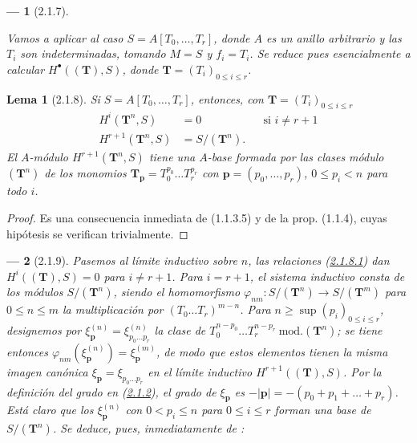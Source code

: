 \documentclass[10pt,oneside,openany]{book}
\theoremstyle{egaenv}\newtheorem*{env}{---}
\theoremstyle{egastatement}
\newtheorem*{lemma}{Lema}
\theoremstyle{egadescription}
\renewcommand{\leq}{\leqslant}
\renewcommand{\geq}{\geqslant}
\begin{document}
\begin{env}[2.1.7]
\label{III.2.1.7}
\label{III.2.1.7-fr}

Vamos a aplicar  al caso $S=A[T_0,\ldots,T_r]$, donde $A$ es un anillo arbitrario y las $T_i$ son indeterminadas, tomando $M=S$ y $f_i=T_i$. Se reduce pues esencialmente a calcular $H^\bullet((\mathbf T),S)$, donde $\mathbf T=(T_i)_{0\leq i\leq r}$.
\end{env}

\begin{lemma}[2.1.8]
\label{III.2.1.8}
\label{III.2.1.8-fr}
Si $S=A[T_0,\ldots,T_r]$, entonces, con $\mathbf T=(T_i)_{0\leq i\leq r}$
\begin{align}
\label{III.2.1.8.1-fr}
\tag{2.1.8.1}
H^i(\mathbf T^n,S)&=0 &&\text{si }i\neq r+1\\
\label{III.2.1.8.2-fr}
\tag{2.1.8.2}
H^{r+1}(\mathbf T^n,S)&=S/(\mathbf T^n).
\end{align}
El $A$-módulo $H^{r+1}(\mathbf T^n,S)$ tiene una $A$-base formada por las clases módulo $(\mathbf T^n)$ de los monomios
$\mathbf T_{\mathbf p}=T_0^{p_0}\ldots T_r^{p_r}$ con
$\mathbf p=(p_0,\ldots,p_r)$, $0\leq p_i<n$ para todo $i$.
\end{lemma}

\begin{proof}
Es una consecuencia inmediata de (1.1.3.5) y de la prop. (1.1.4), cuyas
hipótesis se verifican trivialmente.
\end{proof}

\begin{env}[2.1.9]
\label{III.2.1.9-fr}
Pasemos al límite inductivo sobre $n$, las relaciones (\hyperref[III.2.1.8.1]{2.1.8.1}) dan $H^i((\mathbf T),S)=0$ para $i\neq r+1$.
Para $i=r+1$, el sistema inductivo consta de los módulos $S/(\mathbf T^n)$, siendo el homomorfismo
$\varphi_{nm}:S/(\mathbf T^n)\longrightarrow S/(\mathbf T^m)$
para $0\leq n\leq m$
la multiplicación por $(T_0\ldots T_r)^{m-n}$.
Para $n\geq\sup(p_i)_{0\leq i\leq r}$, designemos por
$\xi_{\mathbf p}^{(n)}=\xi_{p_0\ldots p_r}^{(n)}$ la clase de
$T_0^{n-p_0}\ldots T_r^{n-p_r}\ \mathrm{mod.}(\mathbf T^n)$; se tiene entonces
$\varphi_{nm}(\xi_{\mathbf p}^{(n)})=\xi_{\mathbf p}^{(m)}$, de modo que estos elementos tienen la misma imagen canónica $\xi_{\mathbf p}=\xi_{p_0\ldots p_r}$ en el límite inductivo $H^{r+1}((\mathbf T),S)$.
Por la definición del grado en (\hyperref[III.2.1.2]{2.1.2}), el grado de $\xi_{\mathbf p}$ es $-|\mathbf p|=-(p_0+p_1+\ldots+p_r)$.
Está claro que los $\xi_{\mathbf p}^{(n)}$ con $0<p_i\leq n$ para $0\leq i\leq r$ forman una base de $S/(\mathbf T^n)$.
Se deduce, pues, inmediatamente de :
\end{env}
\end{document}
